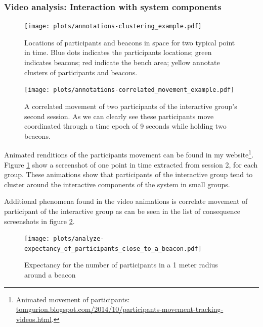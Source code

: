 \documentclass[a4paper,11pt]{article}
\begin{document}
{\subsubsection{Video analysis: Interaction with system components}\label{results:system}

\begin{figure}[!htb]
    \centering
    \texttt{[image: plots/annotations-clustering\_example.pdf]}
    \caption{Locations of participants and beacons in space for two typical point in time. Blue dots indicates the participants locations; green indicates beacons; red indicate the bench area; yellow annotate clusters of participants and beacons.}\label{plot:annotations-clustering_example}
\end{figure}

\begin{figure}[!htb]
    \centering
    \texttt{[image: plots/annotations-correlated\_movement\_example.pdf]}
    \caption{A correlated movement of two participants of the interactive group's second session. As we can clearly see these participants move coordinated through a time epoch of 9 seconds while holding two beacons.}\label{plot:annotations-correlated_movement_example}
\end{figure}

Animated renditions of the participants movement can be found in my website\footnote{Animated movement of participants: \href{http://tomgurion.blogspot.com/2014/10/participants-movement-tracking-videos.html}{tomgurion.blogspot.com/2014/10/participants-movement-tracking-videos.html}.}.
Figure \ref{plot:annotations-clustering_example} show a screenshot of one point in time extracted from session 2, for each group.
These animations show that participants of the interactive group tend to cluster around the interactive components of the system in small groups.

Additional phenomena found in the video animations is correlate movement of participant of the interactive group as can be seen in the list of consequence screenshots in figure \ref{plot:annotations-correlated_movement_example}.

\begin{figure}[!htb]
    \centering
    \texttt{[image: plots/analyze-expectancy\_of\_participants\_close\_to\_a\_beacon.pdf]}
    \caption{Expectancy for the number of participants in a 1 meter radius around a beacon}\label{plot:analyze-expectancy_of_participants_close_to_a_beacon}
\end{figure}

}
\end{document}

